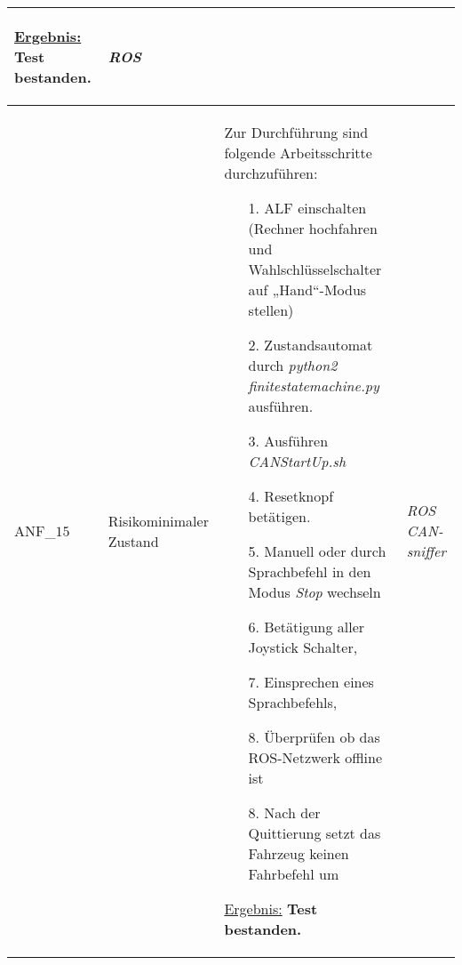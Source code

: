 \documentclass[12pt,a4paper,oneside,numbers=noenddot,captions=tableheading,toc=bibliography,openany,tikz,margin=5mm]{scrbook}
\begin{document}
\begin{longtable}{|p{}|p{}|p{7cm}|p{}|}
\begin{itemize}
	\end{itemize}
	
	\underline{Ergebnis:}\newline
	\newline
	\textbf{Test bestanden.}%
	& \textit{ROS}\newline
	\\
	\hline
		ANF\_$15$& Risikominimaler Zustand & Zur Durchführung sind folgende Arbeitsschritte durchzuführen:
	\begin{itemize}
		\item[1.]	ALF einschalten (Rechner hochfahren und Wahlschlüsselschalter auf „Hand“-Modus stellen)
		\item[2.]	Zustandsautomat durch \textit{python2 finitestatemachine.py} ausführen.
		\item[3.]	Ausführen \textit{CANStartUp.sh}
		\item[4.]	Resetknopf betätigen.
		\item[5.]	Manuell oder durch Sprachbefehl in den Modus \textit{Stop} wechseln
		\item[6.]	Betätigung aller Joystick Schalter,
		\item[7.]   Einsprechen eines Sprachbefehls, 
		\item[8.]	Überprüfen ob das ROS-Netzwerk offline ist
		\item[8.]	Nach der Quittierung setzt das Fahrzeug keinen Fahrbefehl um
	\end{itemize}
	
	\underline{Ergebnis:}\newline
	\newline
	\textbf{Test bestanden.}%
	& \textit{ROS}\newline
	\textit{CAN-sniffer}
	\\
	\hline
\end{longtable} 
\end{document}
